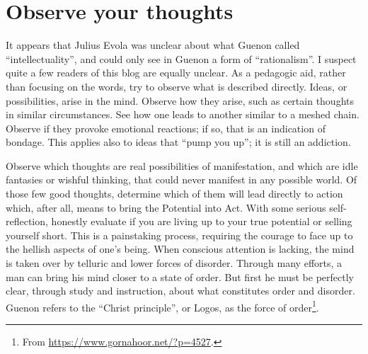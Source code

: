 \section{Observe your thoughts}

It appears that Julius Evola was unclear about what Guenon called “intellectuality”, and could only see in Guenon a form of “rationalism”. 
I suspect quite a few readers of this blog are equally unclear. 
As a pedagogic aid, rather than focusing on the words, try to observe what is described directly. 
Ideas, or possibilities, arise in the mind. 
Observe how they arise, such as certain thoughts in similar circumstances. 
See how one leads to another similar to a meshed chain. 
Observe if they provoke emotional reactions; if so, that is an indication of bondage. 
This applies also to ideas that “pump you up”; it is still an addiction.

Observe which thoughts are real possibilities of manifestation, and which are idle fantasies or wishful thinking, that could never manifest in any possible world. 
Of those few good thoughts, determine which of them will lead directly to action which, after all, means to bring the Potential into Act.
With some serious self-reflection, honestly evaluate if you are living up to your true potential or selling yourself short. 
This is a painstaking process, requiring the courage to face up to the hellish aspects of one’s being. 
When conscious attention is lacking, the mind is taken over by telluric and lower forces of disorder. 
Through many efforts, a man can bring his mind closer to a state of order. 
But first he must be perfectly clear, through study and instruction, about what constitutes order and disorder. 
Guenon refers to the “Christ principle”, or Logos, as the force of order\footnote{From \url{https://www.gornahoor.net/?p=4527}.}.